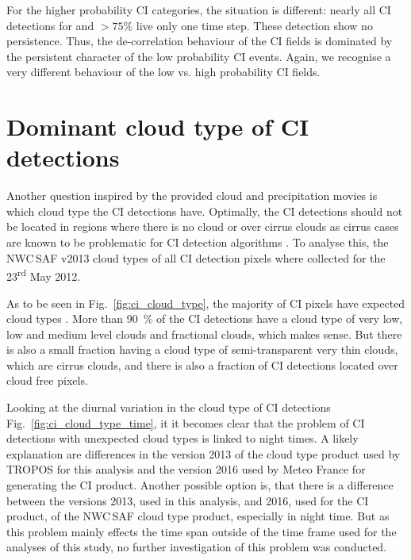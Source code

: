 For the higher probability CI categories, the situation is different: nearly all CI detections for and $>75\%$ live only one time step. These detection show no persistence. Thus, the de-correlation behaviour of the CI fields is dominated by the persistent character of the low probability CI events. Again, we recognise a very different behaviour of the low vs. high probability CI fields.

\section{Dominant cloud type of CI detections}
Another question inspired by the provided cloud and precipitation movies is which cloud type the CI detections have. Optimally, the CI detections should not be located in regions where there is no cloud or over cirrus clouds as cirrus cases are known to be problematic for CI detection algorithms . To analyse this, the NWC\,SAF v2013 cloud types of all CI detection pixels where collected for the 23\textsuperscript{rd} May 2012. 

As to be seen in Fig.~\ref{fig:ci_cloud_type}, the majority of CI pixels have expected cloud types .  More than \SI{90}{\percent} of the CI detections have a cloud type of very low, low and medium level clouds and fractional clouds, which makes sense. But there is also a small fraction having a cloud type of semi-transparent very thin clouds, which are cirrus clouds, and there is also a fraction of CI detections located over cloud free pixels.

Looking at the diurnal variation in the cloud type of CI detections Fig.~\ref{fig:ci_cloud_type_time}, it it becomes clear that the problem of CI detections with unexpected cloud types is linked to night times.  A likely explanation are differences in the version 2013 of the cloud type product used by TROPOS for this analysis and the version 2016 used by Meteo France for generating the CI product. Another possible option is, that there is a difference between the versions 2013, used in this analysis, and 2016, used for the CI product, of the NWC\,SAF cloud type product, especially in night time. But as this problem mainly effects the time span outside of the time frame used for the analyses of this study, no further investigation of this problem was conducted. 

